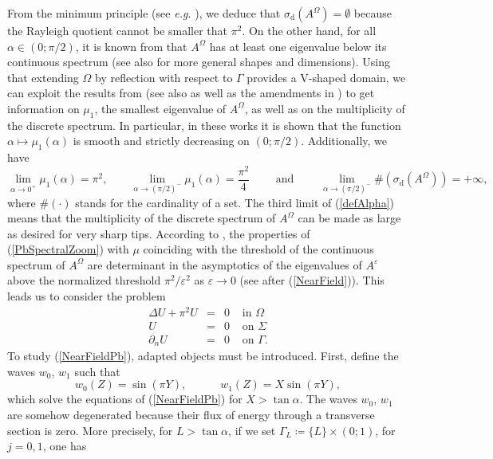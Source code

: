 \documentclass[11pt,a4paper]{article}
\newcommand{\eps}{\varepsilon}
\newcommand{\Om}{\Omega}
\newcommand{\mrm}[1]{\mathrm{#1}}
\begin{document}
From the minimum principle (see \textit{e.g.} \cite[Thm.\,10.2.1]{BiSo87}), we deduce that $\sigma_{\mrm{d}}(A^\Om)=\emptyset$ because the Rayleigh quotient cannot be smaller that $\pi^2$. On the other hand, for all $\alpha \in (0;\pi/2)$, it is known from \cite{ABGM91} that $A^\Om$ has at least one eigenvalue below its continuous spectrum (see also \cite{Naza12a} for more general shapes and dimensions). Using that extending $\Om$ by reflection with respect to $\Gamma$ provides a V-shaped domain, we can exploit the results from \cite{NaSh14} (see also \cite{DaRa12} as well as the amendments in \cite{Naza14c}) to get information on $\mu_1$, the smallest eigenvalue of $A^\Om$, as well as on the multiplicity of the discrete spectrum. In particular, in these works it is shown that the function $\alpha\mapsto \mu_1(\alpha)$ is smooth and strictly decreasing on $(0;\pi/2)$. Additionally, we have 
\begin{equation}\label{defAlpha}
\lim_{\alpha \to 0^+ } \mu_1(\alpha) =  \pi^2,\qquad
\lim_{\alpha \to (\pi/2)^-} \mu_1(\alpha) =  \frac{\pi^2}{4}\qquad\mbox{ and }\qquad\lim_{\alpha \to (\pi/2)^-} \#(\sigma_{\mrm{d}}(A^\Om))=+\infty,
\end{equation}
where $\#(\cdot)$ stands for the cardinality of a set. The third limit of (\ref{defAlpha}) means that the multiplicity of the discrete spectrum of $A^\Om$ can be made as large as desired for very sharp tips.
According to \cite{Grie08}, the properties of (\ref{PbSpectralZoom}) with $\mu$ coinciding with the threshold of the continuous spectrum of $A^\Om$ are determinant in the asymptotics of the eigenvalues of $A^\eps$ above the normalized threshold $\pi^2/\eps^2$ as $\eps\to0$ (see after (\ref{NearField})). This leads us to consider the problem 
\begin{equation}\label{NearFieldPb}
\begin{array}{|rcll}
\Delta U+\pi^2U&=&0&\mbox{ in }\Om\\
U&=&0&\mbox{ on } \Sigma\\[3pt]
\partial_n U  &=& 0 & \mbox{ on }\Gamma.
\end{array}
\end{equation}
To study (\ref{NearFieldPb}), adapted objects must be introduced. First, define the waves $w_0$, $w_1$ such that
\[
w_0(Z)=\sin(\pi Y),\qquad\quad  w_1(Z)=X\sin(\pi Y),
\]
which solve the equations of (\ref{NearFieldPb}) for $X>\tan\alpha$. The waves $w_0$, $w_1$ are somehow degenerated because their flux of energy through a transverse section is zero. More precisely, for $L>\tan\alpha$, if we set $\Gamma_L\coloneqq\{L\}\times(0;1)$, for $j=0,1$, one has
\end{document}
